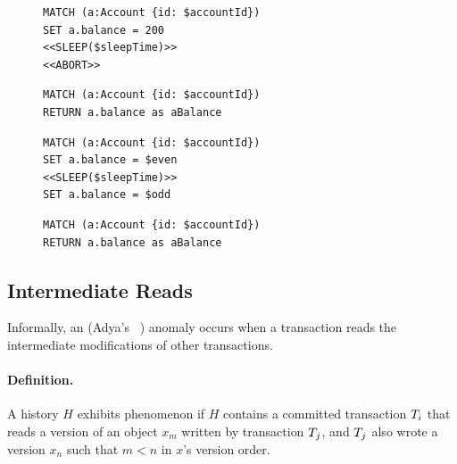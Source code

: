 \begin{figure}[htb]
  \centering
  \begin{minipage}{0.45\linewidth}
    \begin{lstlisting}[language=cypher,label=fig:ar1,caption=\tx{Aborted Read (G1a) $T_\mathrm{W}$}.]
MATCH (a:Account {id: $accountId})
SET a.balance = 200
<<SLEEP($sleepTime)>>
<<ABORT>>
\end{lstlisting}

    \begin{lstlisting}[language=cypher,label=fig:ar2,caption=\tx{Aborted Read (G1a) $T_\mathrm{R}$}.]
MATCH (a:Account {id: $accountId})
RETURN a.balance as aBalance
\end{lstlisting}
  \end{minipage}
  \quad
  \begin{minipage}{0.45\linewidth}
    \begin{lstlisting}[language=cypher,label=fig:ir1,caption=\tx{Interm. Read (G1b) $T_\mathrm{W}$}.]
MATCH (a:Account {id: $accountId})
SET a.balance = $even
<<SLEEP($sleepTime)>>
SET a.balance = $odd
\end{lstlisting}

    \begin{lstlisting}[language=cypher,label=fig:ir2,caption=\tx{Interm. Read (G1b) $T_\mathrm{R}$}.]
MATCH (a:Account {id: $accountId})
RETURN a.balance as aBalance
\end{lstlisting}
  \end{minipage}
\end{figure}

\subsection*{Intermediate Reads}

Informally, an  (Adya's ~\cite{adya1999weak})
anomaly occurs when a transaction reads the intermediate modifications of other
transactions.

\paragraph{Definition.}
A history $H$ exhibits phenomenon  if $H$ contains a committed
transaction $T_i$ that reads a version of an object $x_m$ written by
transaction $T_j$, and $T_j$ also wrote a version $x_n$ such that
$m < n$ in $x$'s version order.


